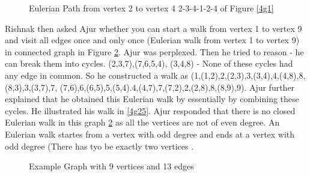 \begin{figure}
\begin{center}
\caption{ Eulerian Path from vertex 2 to vertex 4 2-3-4-1-2-4 of Figure \ref{4g1}}\label{4g15}
\end{center}
\end{figure}
\vspace{2cm}
Rishnak then asked Ajur whether you can start a walk from vertex 1 to vertex 9 and visit all edges once and only once (Eulerian walk from vertex 1 to vertex 9) in connected graph in Figure \ref{4g2}.
Ajur was perplexed. Then he tried to reason - he can break them into cycles. (2,3,7),(7,6,5,4), (3,4,8)  - None of these cycles had any edge in common. So he constructed a 
walk as (1,(1,2),2,(2,3),3,(3,4),4,(4,8),8,(8,3),3,(3,7),7, (7,6),6,(6,5),5,(5,4).4,(4,7),7,(7,2),2,(2,8),8,(8,9),9). Ajur further explained that he obtained this Eulerian walk by essentially by combining these cycles. He illustrated his walk in \ref{4g25}. Ajur responded that there is no closed Eulerian walk in this graph \ref{4g2} as all the vertices are not of even degree. An Eulerian walk startes from a vertex with odd degree and ends at a vertex with odd degree (There has tyo be exactly two vertices .

\begin{figure}
\begin{center}
\caption{ Example Graph with 9 vertices and 13 edges}\label{4g2}
\end{center}
\end{figure}

